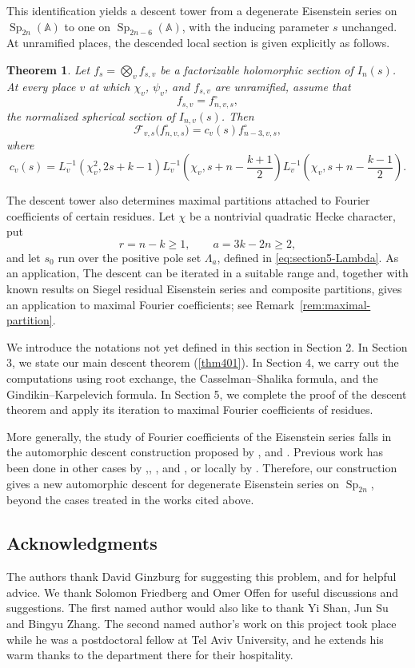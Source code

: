 \documentclass[11pt,notitlepage]{amsart}
\newtheorem{theorem}{Theorem}[section]
\theoremstyle{definition}
\theoremstyle{remark}
\newcommand{\bbA}{\mathbb{A}}
\DeclareMathOperator{\Sp}{Sp}
\begin{document}
This identification yields a descent tower from a degenerate Eisenstein
series on \(\Sp_{2n}(\bbA)\) to one on \(\Sp_{2n-6}(\bbA)\), with the
inducing parameter \(s\) unchanged. At unramified places, the descended
local section is given explicitly as follows.
\begin{theorem}
Let $f_s=\bigotimes_v f_{s,v}$ be a factorizable holomorphic section of $I_n(s)$. At every place
$v$ at which $\chi_v$, $\psi_v$, and $f_{s,v}$ are unramified, assume
that
\[
f_{s,v}=f^\circ_{n,v,s},
\]
the normalized spherical section of $I_{n,v}(s)$. Then
\[
\mathcal F_{v,s}\bigl(f^\circ_{n,v,s}\bigr)
=
c_v(s)f^\circ_{n-3,v,s},
\]
where
\[
c_v(s)=
L_v^{-1}(\chi_v^2,2s+k-1)
L_v^{-1}\left(\chi_v,s+n-\frac{k+1}{2}\right)
L_v^{-1}\left(\chi_v,s+n-\frac{k-1}{2}\right).
\]
\end{theorem}

The descent tower also determines maximal partitions attached to Fourier
coefficients of certain residues.  Let
\(\chi\) be a nontrivial quadratic Hecke character, put
\[
 r=n-k\geq1,\qquad a=3k-2n\geq2,
\]
and let \(s_0\) run over the positive pole set
\(\Lambda_a\), defined in \eqref{eq:section5-Lambda}. As an application, The descent can be iterated in a suitable range and, together with
known results on Siegel residual Eisenstein series and composite
partitions, gives an application to maximal Fourier coefficients;
see Remark~\ref{rem:maximal-partition}.

We introduce the notations not yet defined in this section in Section 2.
In Section 3, we state our main descent theorem (\ref{thm401}). In
Section 4, we carry out the computations using root exchange,
the Casselman--Shalika formula, and the Gindikin--Karpelevich formula. In
Section 5, we complete the proof of the descent theorem and apply its
iteration to maximal Fourier coefficients of residues.

 More generally, the study of Fourier coefficients of the Eisenstein series falls in the automorphic descent construction proposed by \cite{GRS972}, \cite{GRS11} and \cite{GS222}. Previous work has been done in other cases by \cite{ik94},\cite{GRS03}, \cite{GIN06}, \cite{Cai18} and \cite{GS20}, or locally by \cite{MW87}.  Therefore, our construction gives a new automorphic descent for
degenerate Eisenstein series on $\Sp_{2n}$, beyond the cases treated
in the works cited above.
 
\subsection{Acknowledgments}
The authors thank David Ginzburg for suggesting this problem, and for helpful advice. We thank Solomon Friedberg and Omer Offen for useful discussions and suggestions. The first named author would also like to thank Yi Shan, Jun Su and Bingyu Zhang. The second named author's work on this project took place while he was a postdoctoral fellow at Tel Aviv University, and he extends his warm thanks to the department there for their hospitality.
\end{document}
